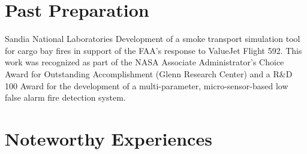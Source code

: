 \documentclass[letterpaper]{twentysecondcv_spd} %
\begin{document}
\section{Past Preparation}

\begin{twenty} 

	 {Sandia National Laboratories}  {Development of a smoke transport simulation tool for cargo bay fires in support of the FAA's response to ValueJet Flight 592. This work was recognized as part of the NASA Associate Administrator's Choice Award for Outstanding Accomplishment (Glenn Research Center) and a R\&D 100 Award for the development of a multi-parameter, micro-sensor-based low false alarm fire detection system.}
  
\end{twenty}

\makeprofileGeneral %

\section{Noteworthy Experiences}

\begin{twentyshort}

	
	
	
\end{twentyshort}

\end{document}
